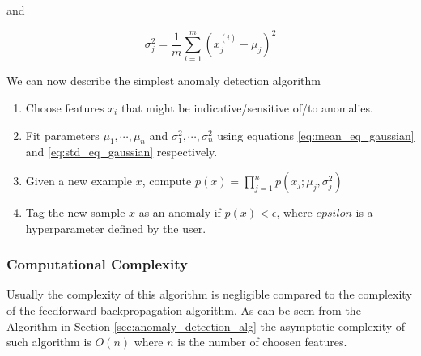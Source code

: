 and

\begin{equation}
\sigma_j^2 = \frac{1}{m} \sum_{i=1}^{m} (x_j^{(i)} - \mu_j)^2
\label{eq:std_eq_gaussian}
\end{equation}

We can now describe the simplest anomaly detection algorithm

\begin{enumerate}
\item Choose features $x_i$ that might be indicative/sensitive of/to anomalies.
\item Fit parameters $\mu_1, \cdots, \mu_n$ and $\sigma_1^2,\cdots, \sigma_n^2$ using equations \eqref{eq:mean_eq_gaussian} and \eqref{eq:std_eq_gaussian} respectively.
\item Given a new example $x$, compute $p(x) = \prod_{j = 1}^n p(x_j; \mu_j, \sigma_j^2)$ 
\item Tag the new sample $x$ as an anomaly if $p(x) < \epsilon$, where $epsilon$ is a hyperparameter defined by the user.
\end{enumerate}

 \subsubsection{Computational Complexity}

Usually the complexity of this algorithm is negligible compared to the complexity of the feedforward-backpropagation algorithm. As can be seen from the Algorithm in Section \ref{sec:anomaly_detection_alg} the asymptotic complexity of such algorithm is $O(n)$ where $n$ is the number of choosen features.